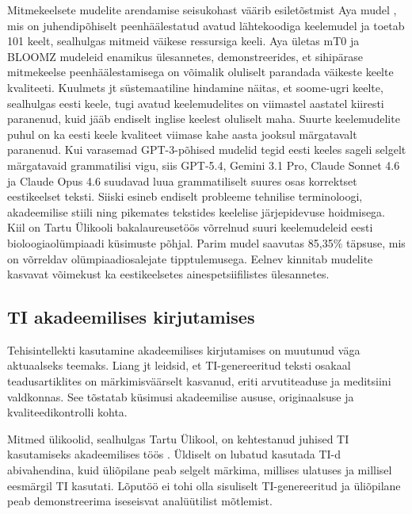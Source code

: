 Mitmekeelsete mudelite arendamise seisukohast väärib esiletõstmist Aya mudel \cite{ustun2024aya}, mis on juhendipõhiselt peenhäälestatud avatud lähtekoodiga keelemudel ja toetab 101 keelt, sealhulgas mitmeid väikese ressursiga keeli. Aya ületas mT0 ja BLOOMZ mudeleid enamikus ülesannetes, demonstreerides, et sihipärase mitmekeelse peenhäälestamisega on võimalik oluliselt parandada väikeste keelte kvaliteeti. Kuulmets jt \cite{kuulmets2025finno} süstemaatiline hindamine näitas, et soome-ugri keelte, sealhulgas eesti keele, tugi avatud keelemudelites on viimastel aastatel kiiresti paranenud, kuid jääb endiselt inglise keelest oluliselt maha. Suurte keelemudelite puhul on ka eesti keele kvaliteet viimase kahe aasta jooksul märgatavalt paranenud. Kui varasemad GPT-3-põhised mudelid tegid eesti keeles sageli selgelt märgatavaid grammatilisi vigu, siis GPT-5.4, Gemini 3.1 Pro, Claude Sonnet 4.6 ja Claude Opus 4.6 suudavad luua grammatiliselt suures osas korrektset eestikeelset teksti. Siiski esineb endiselt probleeme tehnilise terminoloogi, akadeemilise stiili ning pikemates tekstides keelelise järjepidevuse hoidmisega. Kiil \cite{kiil2025bioloogia} on Tartu Ülikooli bakalaureusetöös võrrelnud suuri keelemudeleid eesti bioloogiaolümpiaadi küsimuste põhjal. Parim mudel saavutas 85,35\% täpsuse, mis on võrreldav olümpiaadiosalejate tipptulemusega. Eelnev kinnitab mudelite kasvavat võimekust ka eestikeelsetes ainespetsiifilistes ülesannetes.

\subsection{TI akadeemilises kirjutamises} \label{subsec:ai-akadeemia}

Tehisintellekti kasutamine akadeemilises kirjutamises on muutunud väga aktuaalseks teemaks. Liang jt \cite{liang2024mapping} leidsid, et TI-genereeritud teksti osakaal teadusartiklites on märkimisväärselt kasvanud, eriti arvutiteaduse ja meditsiini valdkonnas. See tõstatab küsimusi akadeemilise aususe, originaalsuse ja kvaliteedikontrolli kohta.

Mitmed ülikoolid, sealhulgas Tartu Ülikool, on kehtestanud juhised TI kasutamiseks akadeemilises töös \cite{tuati2026juhend, tuati2026tehisaru}. Üldiselt on lubatud kasutada TI-d abivahendina, kuid üliõpilane peab selgelt märkima, millises ulatuses ja millisel eesmärgil TI kasutati. Lõputöö ei tohi olla sisuliselt TI-genereeritud ja üliõpilane peab demonstreerima iseseisvat analüütilist mõtlemist.

